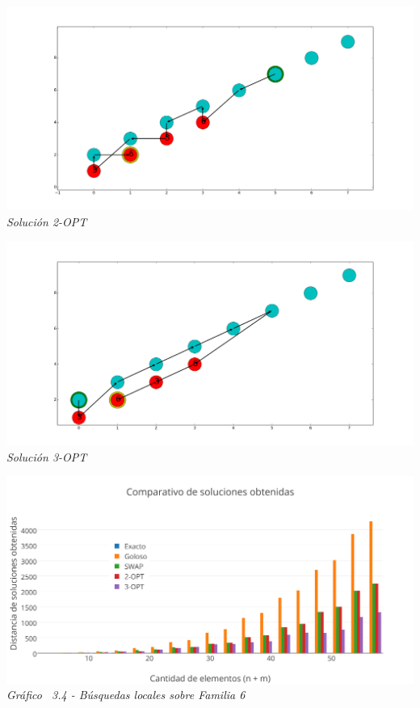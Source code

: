 \vspace*{0.3cm} \vspace*{0.3cm}
  \begin{center}
 \includegraphics[scale=0.3]{./EJ3/sinOrden2opt.png}\\
 {            \textit{Soluci\'on 2-OPT}}
  \end{center}
  \vspace*{0.3cm}


\vspace*{0.3cm} \vspace*{0.3cm}
  \begin{center}
 \includegraphics[scale=0.3]{./EJ3/sinOrden3opt.png}\\
 {            \textit{Soluci\'on 3-OPT}}
  \end{center}
  \vspace*{0.3cm}


\vspace*{0.3cm} \vspace*{0.3cm}
  \begin{center}
 \includegraphics[scale=0.5]{./EJ3/comparacionbusquedaslocalessolucionsinorden.png}\\
 {            \textit{Gráfico \ 3.4 - Búsquedas locales sobre Familia 6}}
  \end{center}
  \vspace*{0.3cm}


